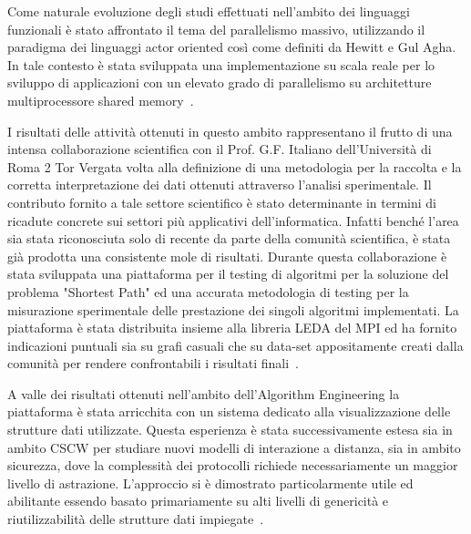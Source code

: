 \documentclass[11pt,a4paper,sans]{moderncv}        %
\begin{document}
{
Come naturale evoluzione degli studi effettuati nell'ambito dei linguaggi funzionali è stato affrontato il tema del parallelismo massivo, utilizzando il paradigma dei linguaggi actor oriented così come definiti da Hewitt e Gul Agha. In tale contesto è stata sviluppata una implementazione su scala reale per lo sviluppo di applicazioni con un elevato grado di parallelismo su architetture multiprocessore shared memory~\cite{cnr:1, cnr:2, litp:1, ISCIS:1, litp:2, ISCIS:3, Cattaneo199281, AICA:1,ISCIS:4,AICA:2}.
}

{
I risultati delle attività ottenuti in questo ambito rappresentano il frutto di una intensa collaborazione scientifica con il Prof. G.F. Italiano dell’Università di Roma 2 Tor Vergata volta alla definizione di una metodologia per la raccolta e la corretta interpretazione dei dati ottenuti attraverso l'analisi sperimentale. Il contributo fornito a tale settore scientifico  è stato determinante in termini di ricadute concrete sui settori più applicativi dell’informatica. Infatti benché l'area sia stata riconosciuta solo di recente da parte della comunità scientifica, è stata  già prodotta una consistente mole di risultati. Durante questa collaborazione è stata sviluppata una piattaforma per il testing di algoritmi per la soluzione del problema "Shortest Path" ed una accurata metodologia di testing per la misurazione sperimentale delle prestazione dei singoli algoritmi implementati. La piattaforma è stata distribuita insieme alla libreria LEDA del MPI ed ha fornito indicazioni puntuali sia su grafi casuali che su data-set appositamente creati dalla comunità per rendere confrontabili i risultati finali~\cite{SODA96:1, jea:1, Amato1997316, ALEX:98, acms:99, Cattaneo2002111, airo:04, Cattaneo2010404}. 
}

{
A valle dei risultati ottenuti nell'ambito dell'Algorithm Engineering la piattaforma è stata arricchita con un sistema dedicato alla visualizzazione delle strutture dati utilizzate. Questa esperienza è stata successivamente estesa sia in ambito CSCW per studiare nuovi modelli di interazione a distanza, sia in ambito sicurezza, dove la complessità dei protocolli richiede necessariamente un maggior livello di astrazione. L'approccio si è dimostrato particolarmente utile ed abilitante essendo basato primariamente su alti livelli di genericità e riutilizzabilità delle strutture dati impiegate~\cite{RETIS:97, ECOM:2, CABOTO:98, Barra199811, IFIP:98,WSDAL:00, Barra2000124,Cattaneo2002391, Cattaneo200441, Cattaneo2008258, Cattaneo2009}.
}
\end{document}
